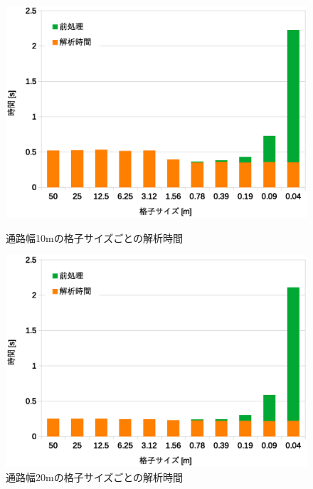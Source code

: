 \begin{figure}[tb]
	\begin{minipage}[b]{0.48\columnwidth}
		\begin{center}
		\includegraphics[width=\columnwidth]{figure/5_10m_jikan.eps}
		\caption{通路幅10mの格子サイズごとの解析時間}
		\label{fig:result_10m_jikan}
		\end{center}
	\end{minipage}
	\hspace{0.04\columnwidth}
	\begin{minipage}[b]{0.48\columnwidth}
		\begin{center}
		\includegraphics[width=\columnwidth]{figure/5_20m_jikan.eps}
		\caption{通路幅20mの格子サイズごとの解析時間}
		\label{fig:result_20m_jikan}
		\end{center}
	\end{minipage}
\end{figure}

